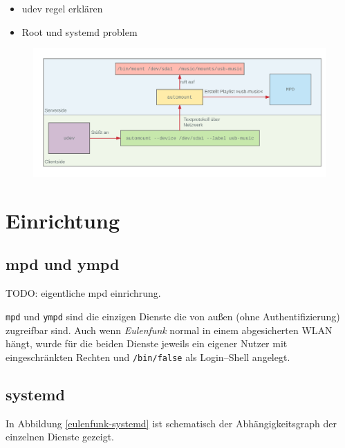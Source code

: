 \documentclass[11pt,ngerman,toc=listof,index=totoc]{scrreprt}
\providecommand{\tightlist}{%
  \setlength{\itemsep}{0pt}\setlength{\parskip}{0pt}}
\begin{document}
\begin{itemize}
\tightlist
\item
  udev regel erklären
\item
  Root und systemd problem
\end{itemize}

\begin{figure}[h!]
  \centering
  \includegraphics[width=1.0\textwidth]{images/eulenfunk-automount.png}
  \caption{}
  \label{eulenfunk-automount}
\end{figure}

\section{Einrichtung}\label{einrichtung}

\subsection{mpd und ympd}\label{mpd-und-ympd}

TODO: eigentliche mpd einrichrung.

\texttt{mpd} und \texttt{ympd} sind die einzigen Dienste die von außen
(ohne Authentifizierung) zugreifbar sind. Auch wenn \emph{Eulenfunk}
normal in einem abgesicherten WLAN hängt, wurde für die beiden Dienste
jeweils ein eigener Nutzer mit eingeschränkten Rechten und
\texttt{/bin/false} als Login--Shell angelegt.

\subsection{systemd}\label{systemd}

In Abbildung \ref{eulenfunk-systemd} ist schematisch der
Abhängigkeitsgraph der einzelnen Dienste gezeigt.
\end{document}

